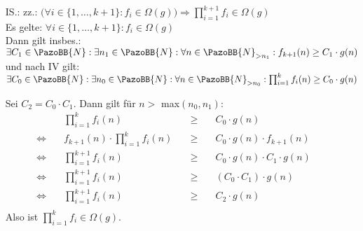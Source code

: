 \documentclass[12pt]{article}
\newcommand {\N}{\PazoBB{N}}   %
\begin{document}
\begin{enumerate}
\item[IS.:] zz.: $\big( \forall i\in\{1, \dots, k+1\} : f_i \in \Omega(g) \big) \Longrightarrow \prod^{k+1}_{i=1} f_i \in\Omega(g)$\\

                      Es gelte: $\forall i\in\{1, \dots, k+1\} : f_i \in \Omega(g)$\\
                      Dann gilt insbes.: $\exists C_1 \in \N : \exists n_1\in \N : \forall n \in\N_{>n_1} : f_{k+1}(n)  \geq C_1 \cdot g(n)$ \\
                      und nach IV gilt: $\exists C_0 \in \N : \exists n_0\in \N : \forall n \in\N_{>n_0} :  \prod^k_{i=1} f_i(n)  \geq C_0\cdot g(n)$ 

                      Sei $C_2 = C_0 \cdot  C_1$. Dann gilt für $n>$ max$(n_0, n_1)$:
                      \begin{align*}
                                                                        &  \prod^k_{i=1} f_i (n)                                    & \quad \geq  \quad& C_0\cdot g(n)                               \\  
                          \Longleftrightarrow  \quad    &  f_{k+1}(n) \cdot \prod^k_{i=1} f_i (n)          & \quad \geq  \quad &C_0\cdot g(n)   \cdot  f_{k+1}(n)                              \\
                          \Longleftrightarrow  \quad    &   \prod^{k+1}_{i=1} f_i (n)                    & \quad \geq  \quad& C_0\cdot g(n)   \cdot       C_1 \cdot g(n)                         \\
                          \Longleftrightarrow  \quad    &   \prod^{k+1}_{i=1} f_i (n)               & \quad \geq  \quad& (C_0 \cdot  C_1) \cdot g(n)                         \\
                          \Longleftrightarrow  \quad    &   \prod^{k+1}_{i=1} f_i (n)                & \quad \geq  \quad &C_2 \cdot g(n)                         \\
                      \end{align*}
                     Also ist $ \prod^k_{i=1} f_i \in\Omega(g)$.








\end{enumerate}
\newpage
\end{document}
